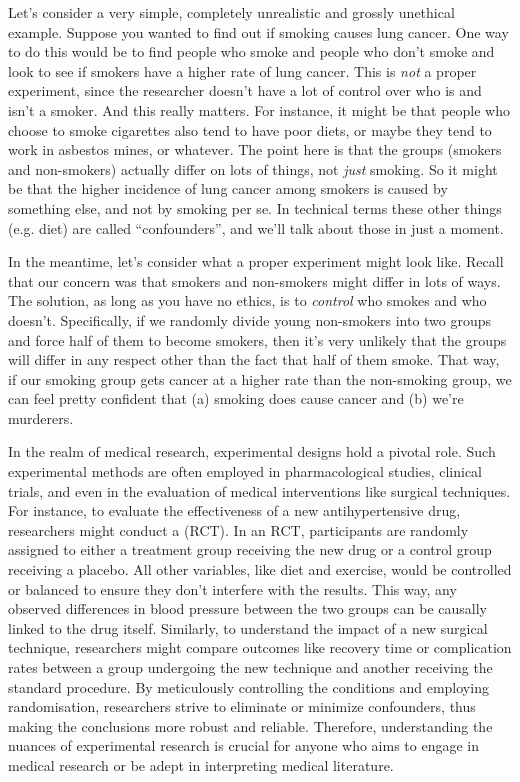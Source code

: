 Let's consider a very simple, completely unrealistic and grossly unethical example. Suppose you wanted to find out if smoking causes lung cancer. One way to do this would be to find people who smoke and people who don't smoke and look to see if smokers have a higher rate of lung cancer. This is {\it not} a proper experiment, since the researcher doesn't have a lot of control over who is and isn't a smoker. And this really matters. For instance, it might be that people who choose to smoke cigarettes also tend to have poor diets, or maybe they tend to work in asbestos mines, or whatever. The point here is that the groups (smokers and non-smokers) actually differ on lots of things, not {\it just} smoking. So it might be that the higher incidence of lung cancer among smokers is caused by something else, and not by smoking per se. In technical terms these other things (e.g. diet) are called ``confounders'', and we'll talk about those in just a moment. 

In the meantime, let's consider what a proper experiment might look like. Recall that our concern was that smokers and non-smokers might differ in lots of ways. The solution, as long as you have no ethics, is to {\it control} who smokes and who doesn't. Specifically, if we randomly divide young non-smokers into two groups and force half of them to become smokers, then it's very unlikely that the groups will differ in any respect other than the fact that half of them smoke. That way, if our smoking group gets cancer at a higher rate than the non-smoking group, we can feel pretty confident that (a) smoking does cause cancer and (b) we're murderers. 

In the realm of medical research, experimental designs hold a pivotal role. Such experimental methods are often employed in pharmacological studies, clinical trials, and even in the evaluation of medical interventions like surgical techniques. For instance, to evaluate the effectiveness of a new antihypertensive drug, researchers might conduct a  (RCT). In an RCT, participants are randomly assigned to either a treatment group receiving the new drug or a control group receiving a placebo. All other variables, like diet and exercise, would be controlled or balanced to ensure they don't interfere with the results. This way, any observed differences in blood pressure between the two groups can be causally linked to the drug itself. Similarly, to understand the impact of a new surgical technique, researchers might compare outcomes like recovery time or complication rates between a group undergoing the new technique and another receiving the standard procedure. By meticulously controlling the conditions and employing randomisation, researchers strive to eliminate or minimize confounders, thus making the conclusions more robust and reliable. Therefore, understanding the nuances of experimental research is crucial for anyone who aims to engage in medical research or be adept in interpreting medical literature.


